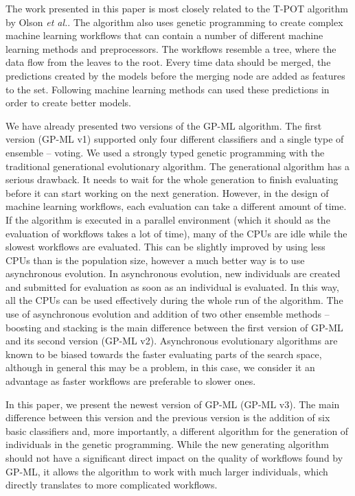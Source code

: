 \documentclass{ws-ijait}
\begin{document}
The work presented in this paper is most closely related to the T-POT algorithm 
by Olson \emph{et al.}\cite{Olson2016EvoBIO}. The algorithm also uses genetic
programming to create complex machine learning workflows that can contain a 
number of different machine learning methods and preprocessors. The workflows
resemble a tree, where the data flow from the leaves to the root. Every time
data should be merged, the predictions created by the models before the merging
node are added as features to the set. Following machine learning methods can 
used these predictions in order to create better models.

We have already presented two versions of the GP-ML algorithm. The first
version\cite{SSCI2015} (GP-ML v1) supported only four different classifiers and
a single type of ensemble -- voting. We used a strongly typed genetic
programming with the traditional generational evolutionary algorithm. The
generational algorithm has a serious drawback. It needs to wait for the whole
generation to finish evaluating before it can start working on the next
generation. However, in the design of machine learning workflows, each
evaluation can take a different amount of time. If the algorithm is executed in
a parallel environment (which it should as the evaluation of workflows takes a
lot of time), many of the CPUs are idle while the slowest workflows are
evaluated. This can be slightly improved by using less CPUs than is the
population size, however a much better way is to use asynchronous evolution. In
asynchronous evolution, new individuals are created and submitted for evaluation
as soon as an individual is evaluated. In this way, all the CPUs can be used
effectively during the whole run of the algorithm. The use of asynchronous
evolution and addition of two other ensemble methods -- boosting and stacking is
the main difference between the first version of GP-ML and its second
version\cite{7814654} (GP-ML v2). Asynchronous evolutionary algorithms are known
to be biased towards the faster evaluating parts of the search
space\cite{Scott:2016:EBQ:2908812.2908934}, although in general this may be a
problem, in this case, we consider it an advantage as faster workflows are
preferable to slower ones.

In this paper, we present the newest version of GP-ML (GP-ML v3). The main
difference between this version and the previous version is the addition of six
basic classifiers and, more importantly, a different algorithm for the
generation of individuals in the genetic programming. While the new generating
algorithm should not have a significant direct impact on the quality of
workflows found by GP-ML, it allows the algorithm to work with much larger
individuals, which directly translates to more complicated workflows.
\end{document}
